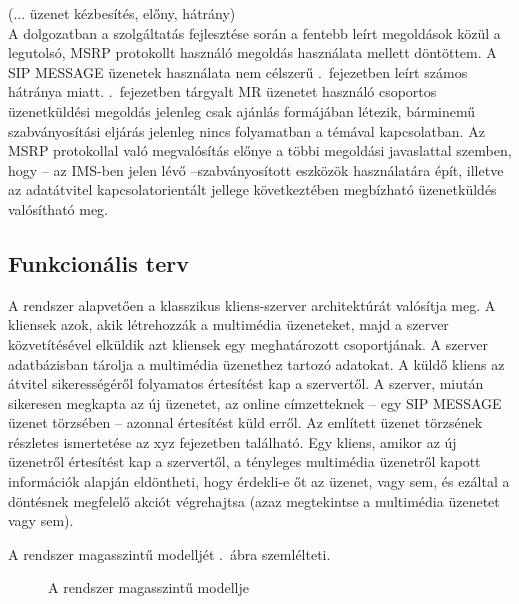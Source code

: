 {\color{red} (... üzenet kézbesítés, előny, hátrány)}
\\
A dolgozatban a szolgáltatás fejlesztése során a fentebb leírt megoldások közül a legutolsó, MSRP protokollt használó megoldás használata mellett döntöttem. A SIP MESSAGE üzenetek használata nem célszerű .~fejezetben leírt számos hátránya miatt. .~fejezetben tárgyalt MR üzenetet használó csoportos üzenetküldési megoldás jelenleg csak ajánlás formájában létezik, bárminemű szabványosítási eljárás jelenleg nincs folyamatban a témával kapcsolatban. Az MSRP protokollal való megvalósítás előnye a többi megoldási javaslattal szemben, hogy -- az IMS-ben jelen lévő --szabványosított eszközök használatára épít, illetve az adatátvitel kapcsolatorientált jellege következtében megbízható üzenetküldés valósítható meg. 

\subsection{Funkcionális terv}

A rendszer alapvetően a klasszikus kliens-szerver architektúrát valósítja meg. A kliensek azok, akik létrehozzák a multimédia üzeneteket, majd a szerver köz\-ve\-tí\-té\-sé\-vel elküldik azt kliensek egy meghatározott csoportjának. A szerver adatbázisban tárolja a multimédia üzenethez tartozó adatokat. A küldő kliens az átvitel si\-ke\-res\-sé\-gé\-ről folyamatos értesítést kap a szervertől. A szerver, miután sikeresen megkapta az új üzenetet, az online címzetteknek -- egy SIP MESSAGE üzenet törzsében -- azonnal értesítést küld erről. Az említett üzenet törzsének részletes ismertetése az {\color{red}xyz fejezetben} található. Egy kliens, amikor az új üzenetről értesítést kap a szervertől, a tényleges multimédia üzenetről kapott információk alapján eldöntheti, hogy érdekli-e őt az üzenet, vagy sem, és ezáltal a döntésnek megfelelő akciót végrehajtsa (azaz megtekintse a multimédia üzenetet vagy sem). 

A rendszer magasszintű modelljét .~ábra szemlélteti.

\begin{figure}[htbp]
\center
{}
\caption{A rendszer magasszintű modellje}
\label{fig:model}
\end{figure}

